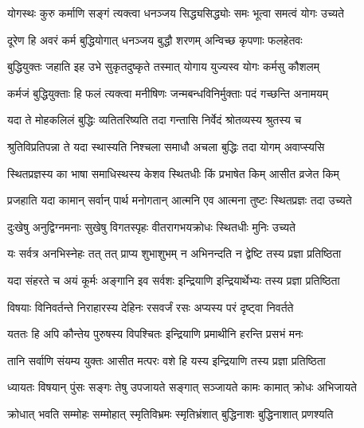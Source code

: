 \twolineshloka
{योगस्थः कुरु कर्माणि सङ्गं त्यक्त्वा धनञ्जय}
{सिद्ध्यसिद्ध्योः समः भूत्वा समत्वं योगः उच्यते}%

\twolineshloka
{दूरेण हि अवरं कर्म बुद्धियोगात् धनञ्जय}
{बुद्धौ शरणम् अन्विच्छ कृपणाः फलहेतवः}%

\twolineshloka
{बुद्धियुक्तः जहाति इह उभे सुकृतदुष्कृते}
{तस्मात् योगाय युज्यस्व योगः कर्मसु कौशलम्}%

\twolineshloka
{कर्मजं बुद्धियुक्ताः हि फलं त्यक्त्वा मनीषिणः}
{जन्मबन्धविनिर्मुक्ताः पदं गच्छन्ति अनामयम्}%

\twolineshloka
{यदा ते मोहकलिलं बुद्धिः व्यतितरिष्यति}
{तदा गन्तासि निर्वेदं श्रोतव्यस्य श्रुतस्य च}%

\twolineshloka
{श्रुतिविप्रतिपन्ना ते यदा स्थास्यति निश्चला}
{समाधौ अचला बुद्धिः तदा योगम् अवाप्स्यसि}%


\twolineshloka
{स्थितप्रज्ञस्य का भाषा समाधिस्थस्य केशव}
{स्थितधीः किं प्रभाषेत किम् आसीत व्रजेत किम्}%


\twolineshloka
{प्रजहाति यदा कामान् सर्वान् पार्थ मनोगतान्}
{आत्मनि एव आत्मना तुष्टः स्थितप्रज्ञः तदा उच्यते}%

\twolineshloka
{दुःखेषु अनुद्विग्नमनाः सुखेषु विगतस्पृहः}
{वीतरागभयक्रोधः स्थितधीः मुनिः उच्यते}%

\twolineshloka
{यः सर्वत्र अनभिस्नेहः तत् तत् प्राप्य शुभाशुभम्}
{न अभिनन्दति न द्वेष्टि तस्य प्रज्ञा प्रतिष्ठिता}%

\twolineshloka
{यदा संहरते च अयं कूर्मः अङ्गानि इव सर्वशः}
{इन्द्रियाणि इन्द्रियार्थेभ्यः तस्य प्रज्ञा प्रतिष्ठिता}%

\twolineshloka
{विषयाः विनिवर्तन्ते निराहारस्य देहिनः}
{रसवर्जं रसः अप्यस्य परं दृष्ट्वा निवर्तते}%

\twolineshloka
{यततः हि अपि कौन्तेय पुरुषस्य विपश्चितः}
{इन्द्रियाणि प्रमाथीनि हरन्ति प्रसभं मनः}%

\twolineshloka
{तानि सर्वाणि संयम्य युक्तः आसीत मत्परः}
{वशे हि यस्य इन्द्रियाणि तस्य प्रज्ञा प्रतिष्ठिता}%

\twolineshloka
{ध्यायतः विषयान् पुंसः सङ्गः तेषु उपजायते}
{सङ्गात् सञ्जायते कामः कामात् क्रोधः अभिजायते}%

\twolineshloka
{क्रोधात् भवति सम्मोहः सम्मोहात् स्मृतिविभ्रमः}
{स्मृतिभ्रंशात् बुद्धिनाशः बुद्धिनाशात् प्रणश्यति}%

